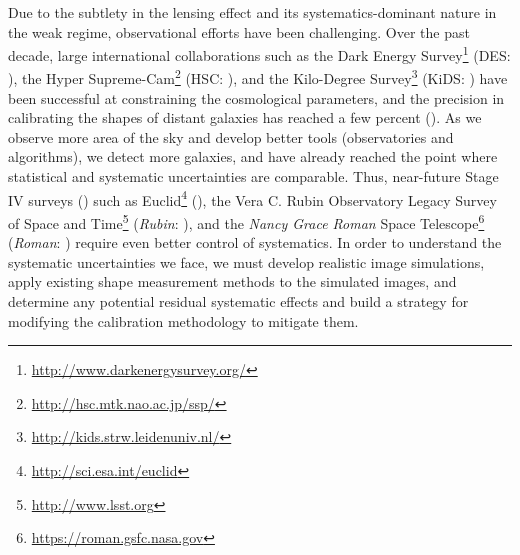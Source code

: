 \documentclass[fleqn,usenatbib]{mnras}
\begin{document}
Due to the subtlety in the lensing effect and its systematics-dominant nature in the weak regime, observational efforts have been challenging. Over the past decade, large international collaborations such as the Dark Energy Survey\footnote{\url{http://www.darkenergysurvey.org/}} (DES: \citealt{2005astro.ph.10346T}), the Hyper Supreme-Cam\footnote{\url{http://hsc.mtk.nao.ac.jp/ssp/}} (HSC: \citealt{2018PASJ...70S...4A}), and the Kilo-Degree Survey\footnote{\url{http://kids.strw.leidenuniv.nl/}} (KiDS: \citealt{2013ExA....35...25D}) have been successful at constraining the cosmological parameters, and the precision in calibrating the shapes of distant galaxies has reached a few percent (\citealt{2020arXiv201103408G, 2020arXiv201208567M, 2021A&A...645A.105G}). As we observe more area of the sky and develop better tools (observatories and algorithms), we detect more galaxies, and have already reached the point where statistical and systematic uncertainties are comparable. Thus, near-future Stage IV surveys (\citealt{2006astro.ph..9591A}) such as Euclid\footnote{\url{ http://sci.esa.int/euclid}} (\citealt{2011arXiv1110.3193L}), the Vera C. Rubin Observatory Legacy Survey of Space and Time\footnote{\url{ http://www.lsst.org}} (\emph{Rubin}: \citealt{2009arXiv0912.0201L, 2019ApJ...873..111I}), and the \emph{Nancy Grace Roman} Space Telescope\footnote{\url{https://roman.gsfc.nasa.gov}} (\emph{Roman}: \citealt{2015arXiv150303757S}) require even better control of systematics. In order to understand the systematic uncertainties we face, we must develop realistic image simulations, apply existing shape measurement methods to the simulated images, and determine any potential residual systematic effects and build a strategy for modifying the calibration methodology to mitigate them.  
\end{document}
